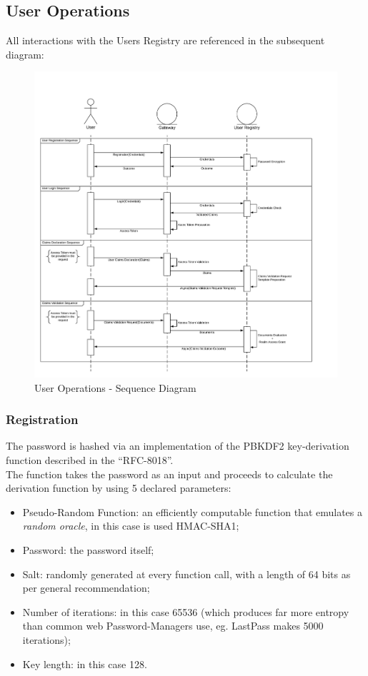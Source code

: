 \documentclass{article}
\begin{document}
\subsection{User Operations}
All interactions with the Users Registry are referenced in the subsequent diagram:
\begin{figure}[h]
    \centering
    \includegraphics[scale=0.40]{Users_Operations-Sequence_Diagram.jpeg}
    \caption{User Operations - Sequence Diagram}
    \label{fig:User_Operations}
\end{figure}{}

\subsubsection{Registration}
The password is hashed via an implementation of the PBKDF2 key-derivation function described in the ``RFC-8018''\cite{PBKDF2}.\\
The function takes the password as an input and proceeds to calculate the derivation function by using 5 declared parameters:\\
\begin{itemize}
    \item Pseudo-Random Function: an efficiently computable function that emulates a \textit{random oracle}, in this case is used HMAC-SHA1;
    \item Password: the password itself;
    \item Salt: randomly generated at every function call, with a length of 64 bits as per general recommendation;
    \item Number of iterations: in this case 65536 (which produces far more entropy than common web Password-Managers use, eg. LastPass makes 5000 iterations);
    \item Key length: in this case 128.
\end{itemize}
\end{document}
